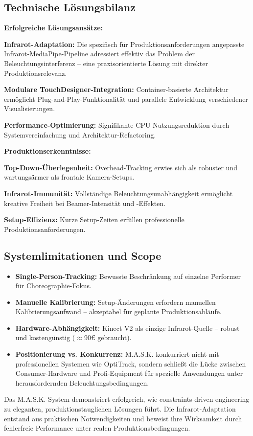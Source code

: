 \subsection{Technische Lösungsbilanz}

\textbf{Erfolgreiche Lösungsansätze:}

\textbf{Infrarot-Adaptation:} Die spezifisch für Produktionsanforderungen angepasste Infrarot-MediaPipe-Pipeline adressiert effektiv das Problem der Beleuchtungsinterferenz – eine praxisorientierte Lösung mit direkter Produktionsrelevanz.

\textbf{Modulare TouchDesigner-Integration:} Container-basierte Architektur ermöglicht Plug-and-Play-Funktionalität und parallele Entwicklung verschiedener Visualisierungen.

\textbf{Performance-Optimierung:} Signifikante CPU-Nutzungsreduktion durch Systemvereinfachung und Architektur-Refactoring.

\textbf{Produktionserkenntnisse:}

\textbf{Top-Down-Überlegenheit:} Overhead-Tracking erwies sich als robuster und wartungsärmer als frontale Kamera-Setups.

\textbf{Infrarot-Immunität:} Vollständige Beleuchtungsunabhängigkeit ermöglicht kreative Freiheit bei Beamer-Intensität und -Effekten.

\textbf{Setup-Effizienz:} Kurze Setup-Zeiten erfüllen professionelle Produktionsanforderungen.

\subsection{Systemlimitationen und Scope}

\begin{itemize}
    \item \textbf{Single-Person-Tracking:} Bewusste Beschränkung auf einzelne Performer für Choreographie-Fokus.
    \item \textbf{Manuelle Kalibrierung:} Setup-Änderungen erfordern manuellen Kalibrierungsaufwand – akzeptabel für geplante Produktionsabläufe.
    \item \textbf{Hardware-Abhängigkeit:} Kinect V2 als einzige Infrarot-Quelle – robust und kostengünstig ($\approx$90€ gebraucht).
    \item \textbf{Positionierung vs. Konkurrenz:} M.A.S.K. konkurriert nicht mit professionellen Systemen wie OptiTrack, sondern schließt die Lücke zwischen Consumer-Hardware und Profi-Equipment für spezielle Anwendungen unter herausfordernden Beleuchtungsbedingungen.
\end{itemize}

Das M.A.S.K.-System demonstriert erfolgreich, wie constraints-driven engineering zu eleganten, produktionstauglichen Lösungen führt. Die Infrarot-Adaptation entstand aus praktischen Notwendigkeiten und beweist ihre Wirksamkeit durch fehlerfreie Performance unter realen Produktionsbedingungen.
